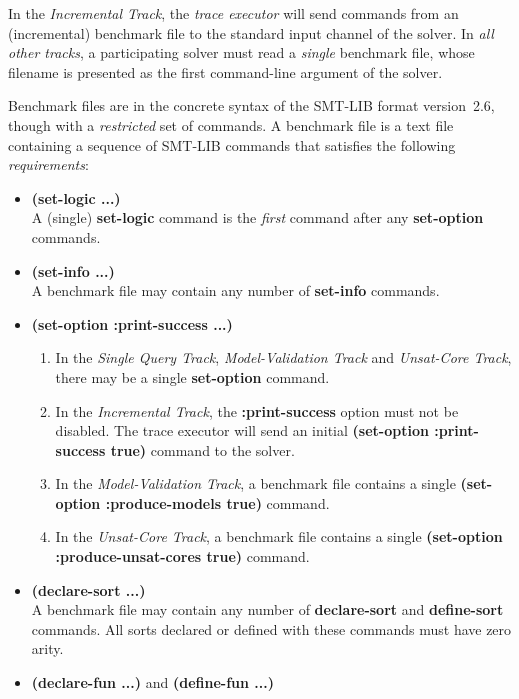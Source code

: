 \documentclass[12pt]{article}
\newcommand{\akey}[1]{\textbf{#1}\xspace}
\newcommand{\bkey}[1]{\textbf{{#1}}\xspace}
\newcommand{\maintrack}{Single Query Track\xspace}
\newcommand{\inctrack}{Incremental Track\xspace}
\newcommand{\ucoretrack}{Unsat-Core Track\xspace}
\newcommand{\mvaltrack}{Model-Validation Track\xspace}
\begin{document}
%
In the \emph{\inctrack}, the \emph{trace executor} will send commands from an
(incremental) benchmark file to the standard input channel of the solver.  In
\emph{all other tracks}, a participating solver must read a \emph{single}
benchmark file, whose filename is presented as the first command-line argument
of the solver.

Benchmark files are in the concrete syntax of the SMT-LIB format
version~2.6, though with a \emph{restricted} set of commands.  A benchmark
file is a text file containing a sequence of SMT-LIB commands that
satisfies the following \emph{requirements}:
%
\begin{itemize}
  \item \bkey{(set-logic ...)}\\
    A (single) \akey{set-logic} command is the \emph{first} command after
    any \akey{set-option} commands.
  \item \bkey{(set-info ...)}\\
    A benchmark file may contain any number of \akey{set-info} commands.
  \item
    \bkey{(set-option :print-success ...)}
    \begin{enumerate}[label=(\alph*)]
      \vspace{-1ex}
    \item In the \emph{\maintrack}, \emph{\mvaltrack} and
        \emph{\ucoretrack}, there may be a single \akey{set-option} command.
      \item In the \emph{\inctrack}, the \akey{:print-success} option
        must not be disabled.  The trace executor will send an initial
        \akey{(set-option :print-success true)} command to the solver.
      \item In the \emph{\mvaltrack}, a benchmark file contains a single
        \akey{(set-option :produce-models true)} command.
      \item In the \emph{\ucoretrack}, a benchmark file contains a single
        \akey{(set-option :produce-unsat-cores true)} command.
    \end{enumerate}
  \item \bkey{(declare-sort ...)}\\
    A benchmark file may contain any number of \akey{declare-sort} and
    \akey{define-sort} commands.  All sorts declared or defined with these
    commands must have zero arity.
  \item \bkey{(declare-fun ...)} and \bkey{(define-fun ...)}\\

\end{itemize}
\end{document}
